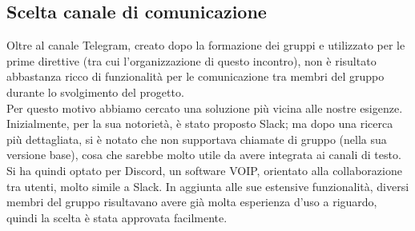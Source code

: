 	\subsection{Scelta canale di comunicazione}
	Oltre al canale Telegram, creato dopo la formazione dei gruppi e utilizzato per le prime direttive (tra cui l'organizzazione di questo incontro), non è risultato abbastanza ricco di funzionalità per le comunicazione tra membri del gruppo durante lo svolgimento del progetto.\\
	Per questo motivo abbiamo cercato una soluzione più vicina alle nostre esigenze.\\
	Inizialmente, per la sua notorietà, è stato proposto Slack; ma dopo una ricerca più dettagliata, si è notato che non supportava chiamate di gruppo (nella sua versione base), cosa che sarebbe molto utile da avere integrata ai canali di testo.\\
	Si ha quindi optato per Discord, un software VOIP, orientato alla collaborazione tra utenti, molto simile a Slack. In aggiunta alle sue estensive funzionalità, diversi membri del gruppo risultavano avere già molta esperienza d'uso a riguardo, quindi la scelta è stata approvata facilmente.